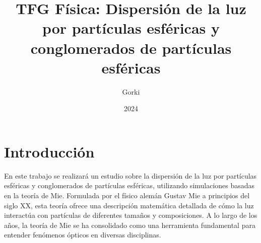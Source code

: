 \documentclass{article}
\title{TFG Física: Dispersión de la luz por partículas esféricas y conglomerados de partículas esféricas}
\author{Gorki}
\date{2024}
\begin{document}
\maketitle





\section{Introducción}
\hspace{1em} En este trabajo se realizará un estudio sobre la dispersión de la 
luz por partículas esféricas y conglomerados de partículas 
esféricas, utilizando simulaciones basadas en la teoría de Mie. 
Formulada por el físico alemán Gustav Mie a principios del 
siglo XX, esta teoría ofrece una descripción matemática 
detallada de cómo la luz interactúa con partículas de 
diferentes tamaños y composiciones. A lo largo de los años, 
la teoría de Mie se ha consolidado como una herramienta 
fundamental para entender fenómenos ópticos en diversas 
disciplinas.
\end{document}
